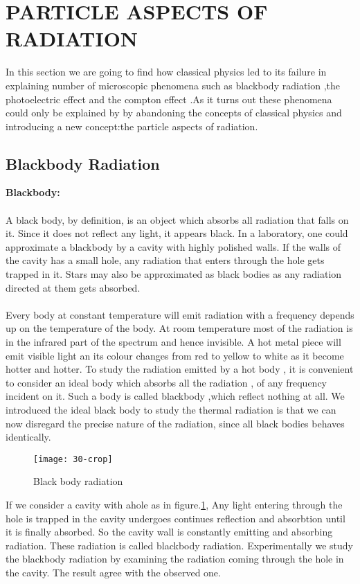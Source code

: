   \section{PARTICLE ASPECTS OF RADIATION}
  In this section we are going to find how classical physics led to its failure in explaining number of microscopic phenomena such as blackbody radiation ,the photoelectric effect and the compton effect .As it turns out these phenomena could only be explained by by abandoning the concepts of classical physics and introducing a new concept:the particle aspects of radiation.
  \subsection{Blackbody Radiation}
  {\textbf{\large Blackbody:}}\\\\
  A black body, by definition, is an object which absorbs all radiation that falls on it. Since it does not reflect any light, it appears black. In a laboratory, one could approximate a blackbody by a cavity with highly polished walls. If the walls of the cavity has a small hole, any radiation that enters through the hole gets trapped in it. Stars may also be approximated as black bodies as any radiation directed at them gets absorbed.\\\\
  Every  body at constant temperature will emit radiation with a frequency depends up on the temperature of the body. At room temperature most of the radiation is in the infrared part of the spectrum and hence invisible. A hot metal piece will emit visible light an its colour changes from red to yellow to white as it become hotter and hotter. To study the radiation emitted by a hot body , it is convenient to consider an ideal body  which absorbs all the radiation , of any frequency incident on it. Such a body is called blackbody  ,which reflect nothing at all. We introduced the ideal black body to study the thermal radiation is that we can now disregard the precise nature of the radiation, since all black bodies behaves identically.\\
  \begin{figure}[H]
  	\centering
  	\texttt{[image: 30-crop]}
  	\caption{Black body radiation}
  	\label{Black body radiation}
  \end{figure}
  If we consider a cavity with ahole  as in figure.\ref{Black body radiation}, Any light entering through the hole is trapped in the cavity undergoes continues reflection and absorbtion until it is finally absorbed. So the cavity wall is constantly emitting and absorbing radiation. These radiation is called blackbody radiation. Experimentally we study the blackbody radiation by examining the radiation coming through the hole in the cavity. The result agree with the observed one.
